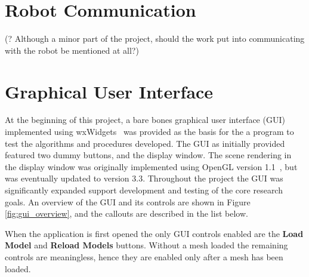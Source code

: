 \section{Robot Communication}
(? Although a minor part of the project, should the work put into communicating with the robot be mentioned at all?)

\section{Graphical User Interface}
At the beginning of this project, a bare bones graphical user interface (GUI) implemented using wxWidgets~\cite{wxWidgets} was provided as the basis for the a program to test the algorithms and procedures developed.
The GUI as initially provided featured two dummy buttons, and the display window.
The scene rendering in the display window was originally implemented using OpenGL version 1.1~\cite{OpenGL_wiki}, but was eventually updated to version 3.3.
Throughout the project the GUI was significantly expanded support development and testing of the core research goals.
An overview of the GUI and its controls are shown in Figure \ref{fig:gui_overview}, and the callouts are described in the list below.

When the application is first opened the only GUI controls enabled are the \textbf{Load Model} and \textbf{Reload Models} buttons.
Without a mesh loaded the remaining controls are meaningless, hence they are enabled only after a mesh has been loaded.


